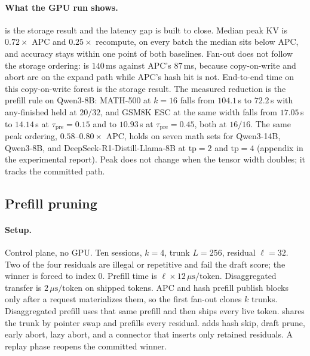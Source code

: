 \paragraph{What the GPU run shows.}
 is the storage result and the latency gap \app is built to close.
Median peak KV is $0.72\times$ APC and $0.25\times$ recompute, on every batch the median sits below APC, and accuracy stays within one point of both baselines.
Fan-out does not follow the storage ordering: \sys is $140$\,ms against APC's $87$\,ms, because copy-on-write and abort are on the expand path while APC's hash hit is not.
End-to-end time on this copy-on-write forest is the storage result.
The measured reduction is the prefill rule on Qwen3-8B: MATH-500 at $k{=}16$ falls from $104.1$\,s to $72.2$\,s with any-finished held at $20/32$, and GSM8K ESC at the same width falls from $17.05$\,s to $14.14$\,s at $\tau_{\mathrm{pre}}{=}0.15$ and to $10.93$\,s at $\tau_{\mathrm{pre}}{=}0.45$, both at $16/16$.
The same peak ordering, $0.58$--$0.80\times$ APC, holds on seven math sets for Qwen3-14B, Qwen3-8B, and DeepSeek-R1-Distill-Llama-8B at $\mathrm{tp}{=}2$ and $\mathrm{tp}{=}4$ (appendix in the experimental report).
Peak does not change when the tensor width doubles; it tracks the committed path.

\subsection{Prefill pruning}
\label{sec:eval-app}

\paragraph{Setup.}
Control plane, no GPU.
Ten sessions, $k{=}4$, trunk $L{=}256$, residual $\ell{=}32$.
Two of the four residuals are illegal or repetitive and fail the draft score; the winner is forced to index $0$.
Prefill time is $\ell \times 12\,\mu\mathrm{s}/\mathrm{token}$.
Disaggregated transfer is $2\,\mu\mathrm{s}/\mathrm{token}$ on shipped tokens.
APC and hash prefill publish blocks only after a request materializes them, so the first fan-out clones $k$ trunks.
Disaggregated prefill uses that same prefill and then ships every live token.
\sys shares the trunk by pointer swap and prefills every residual.
\app adds hash skip, draft prune, early abort, lazy abort, and a connector that inserts only retained residuals.
A replay phase reopens the committed winner.

